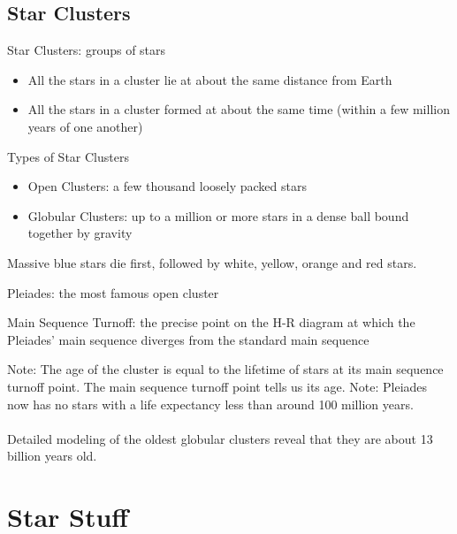 \documentclass[12pt]{article}
\begin{document}
\subsection{Star Clusters} 
\begin{definition} Star Clusters: groups of stars \begin{itemize} 
\item All the stars in a cluster lie at about the same distance from Earth
\item All the stars in a cluster formed at about the same time (within a few million years of one another) \end{itemize} \end{definition}
Types of Star Clusters \begin{itemize} 
\item Open Clusters: a few thousand loosely packed stars 
\item Globular Clusters: up to a million or more stars in a dense ball bound together by gravity \end{itemize}
Massive blue stars die first, followed by white, yellow, orange and red stars. 
\begin{definition} Pleiades: the most famous open cluster \end{definition}
\begin{definition} Main Sequence Turnoff: the precise point on the H-R diagram at which the Pleiades' main sequence diverges from the standard main sequence \end{definition}
Note: The age of the cluster is equal to the lifetime of stars at its main sequence turnoff point. The main sequence turnoff point tells us its age. 
Note: Pleiades now has no stars with a life expectancy less than around 100 million years. \\~\\
Detailed modeling of the oldest globular clusters reveal that they are about 13 billion years old. 

\section{Star Stuff}
\end{document}
